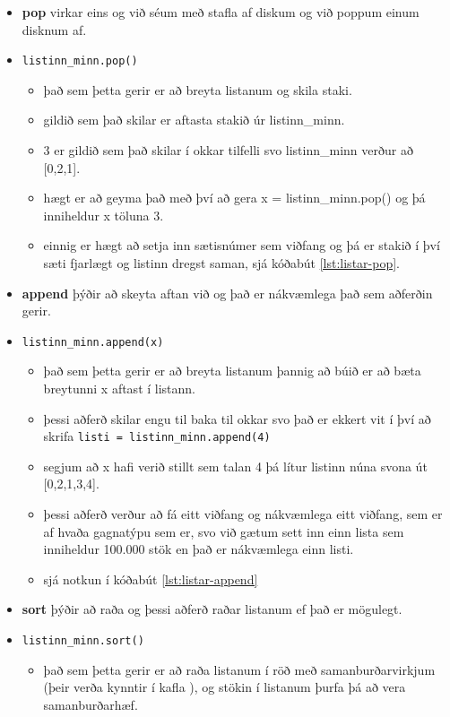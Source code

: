 \begin{itemize}[]
	\item \textbf{pop} virkar eins og við séum með stafla af diskum og við poppum einum disknum af.
	\item[] \texttt{listinn\_minn.pop()}
	\begin{itemize}
		\item það sem þetta gerir er að breyta listanum og skila staki.
		\item gildið sem það skilar er aftasta stakið úr listinn\_minn.
		\item 3 er gildið sem það skilar í okkar tilfelli svo listinn\_minn verður að [0,2,1].
		\item hægt er að geyma það með því að gera x = listinn\_minn.pop() og þá inniheldur x töluna 3.
		\item einnig er hægt að setja inn sætisnúmer sem viðfang og þá er stakið í því sæti fjarlægt og listinn dregst saman, sjá kóðabút \ref{lst:listar-pop}.
	\end{itemize}
	\item \textbf{append} þýðir að skeyta aftan við og það er nákvæmlega það sem aðferðin gerir.
	\item[] \texttt{listinn\_minn.append(x)}
	\begin{itemize}
		\item það sem þetta gerir er að breyta listanum þannig að búið er að bæta breytunni x aftast í listann.
		\item þessi aðferð skilar engu til baka til okkar svo það er ekkert vit í því að skrifa \texttt{listi = listinn\_minn.append(4)}
		\item segjum að x hafi verið stillt sem talan 4 þá lítur listinn núna svona út [0,2,1,3,4].
		\item þessi aðferð verður að fá eitt viðfang og nákvæmlega eitt viðfang, sem er af hvaða gagnatýpu sem er, svo við gætum sett inn einn lista sem inniheldur 100.000 stök en það er nákvæmlega einn listi.
		\item sjá notkun í kóðabút \ref{lst:listar-append}
	\end{itemize}
	\item \textbf{sort} þýðir að raða og þessi aðferð raðar listanum ef það er mögulegt.
	\item[] \texttt{listinn\_minn.sort()}
	\begin{itemize}
		\item það sem þetta gerir er að raða listanum í röð með samanburðarvirkjum (þeir verða kynntir í kafla ), og stökin í listanum þurfa þá að vera samanburðarhæf.

\end{itemize}
\end{itemize}

